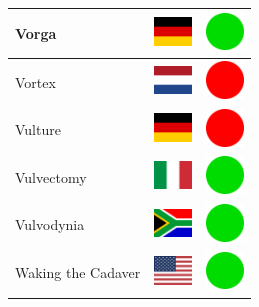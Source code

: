 \documentclass[12pt, a4paper, twoside]{report}
\begin{document}
\begin{center}
\begin{longtable}{|p{5cm}|p{2cm}|p{2cm}|}
 Vorga                                                      & \includegraphics[width=1cm]{../img/flags/de} &   \includegraphics[width=1cm]{../likes/y} \\ \hline
 Vortex                                                     & \includegraphics[width=1cm]{../img/flags/nl} &   \includegraphics[width=1cm]{../likes/n} \\ \hline
 Vulture                                                    & \includegraphics[width=1cm]{../img/flags/de} &   \includegraphics[width=1cm]{../likes/n} \\ \hline
 Vulvectomy                                                 & \includegraphics[width=1cm]{../img/flags/it} &   \includegraphics[width=1cm]{../likes/y} \\ \hline
 Vulvodynia                                                 & \includegraphics[width=1cm]{../img/flags/za} &   \includegraphics[width=1cm]{../likes/y} \\ \hline
 Waking the Cadaver                                         & \includegraphics[width=1cm]{../img/flags/us} &   \includegraphics[width=1cm]{../likes/y} \\ \hline

\end{longtable}
\end{center}
\end{document}
